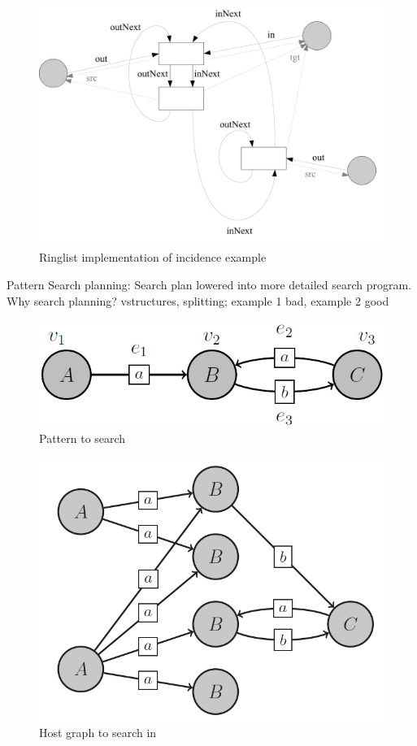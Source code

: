 \begin{figure}[htbp]
  \centering
  \includegraphics[width=\textwidth]{fig/IncidenceExampleRinglists}
  \caption{Ringlist implementation of incidence example}
  \label{figincidenceexampleringlists}
\end{figure}


Pattern Search planning: Search plan lowered into more detailed search program.
Why search planning? vstructures, splitting; example 1 bad, example 2 good

\begin{figure}[htbp]
  \centering
  \includegraphics[width=\textwidth]{fig/Pattern}
  \caption{Pattern to search}
  \label{figpatterntosearch}
\end{figure}

\begin{figure}[htbp]
  \centering
  \includegraphics[width=\textwidth]{fig/Graph}
  \caption{Host graph to search in}
  \label{figgraphtosearchin}
\end{figure}

